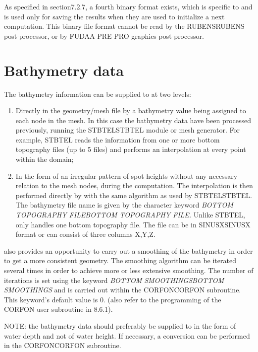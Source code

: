  As specified in section7.2.7, a fourth binary format exists, which is specific to \tomawac and is used only for saving the results when they are used to initialize a next computation. This binary file format cannot be read by the RUBENSRUBENS post-processor, or by FUDAA PRE-PRO graphics post-processor.


\section{ Bathymetry data }

 The bathymetry information can be supplied to \tomawac at two levels:

\begin{enumerate}
\item  Directly in the geometry/mesh file by a bathymetry value being assigned to each node in the mesh. In this case the bathymetry data have been processed previously, running the STBTELSTBTEL module or mesh generator. For example, STBTEL reads the information from one or more bottom topography files (up to 5 files) and performs an interpolation at every point within the domain;

\item  In the form of an irregular pattern of spot heights without any necessary relation to the mesh nodes, during the \tomawac computation. The interpolation is then performed directly by \tomawac with the same algorithm as used by STBTELSTBTEL. The bathymetry file name is given by the character keyword \textit{BOTTOM TOPOGRAPHY FILEBOTTOM TOPOGRAPHY FILE. }Unlike STBTEL, \tomawac only handles one bottom topography file. The file can be in SINUSXSINUSX format or can consist of three columns X,Y,Z.
\end{enumerate}

 \tomawac also provides an opportunity to carry out a smoothing of the bathymetry in order to get a more consistent geometry. The smoothing algorithm can be iterated several times in order to achieve more or less extensive smoothing. The number of iterations is set using the keyword \textit{BOTTOM SMOOTHINGSBOTTOM SMOOTHINGS} and is carried out within the CORFONCORFON subroutine. This keyword's default value is 0. (also refer to the programming of the CORFON user subroutine in 8.6.1).

 NOTE: the bathymetry data should preferably be supplied to \tomawac in the form of water depth and not of water height. If necessary, a conversion can be performed in the CORFONCORFON subroutine.


